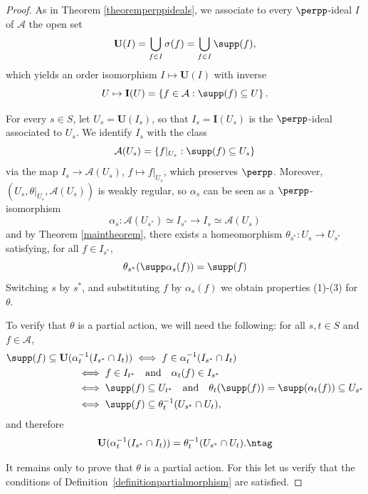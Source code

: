 \begin{proof}
As in Theorem \ref{theoremperppideals}, we associate to every $\perpp$-ideal $I$ of $\mathcal{A}$ the open set
\[\mathbf{U}(I)=\bigcup_{f\in I}\sigma(f)=\bigcup_{f\in I}\supp(f),\]
which yields an order isomorphism $I\mapsto \mathbf{U}(I)$ with inverse
\[U\mapsto\mathbf{I}(U)=\left\{f\in\mathcal{A}:\supp(f)\subseteq U\right\}.\]

For every $s\in S$, let $U_s=\mathbf{U}(I_s)$, so that $I_s=\mathbf{I}(U_s)$ is the $\perpp$-ideal associated to $U_s$. We identify $I_s$ with the class
\[\mathcal{A}(U_s)=\left\{f|_{U_s}:\supp(f)\subseteq U_s\right\}\]
via the map $I_s\to\mathcal{A}(U_s)$, $f\mapsto f|_{U_s}$, which preserves $\perpp$. Moreover, $(U_s,\theta|_{U_s},\mathcal{A}(U_s))$ is weakly regular, so $\alpha_s$ can be seen as a $\perpp$-isomorphism
\[\alpha_s:\mathcal{A}(U_{s^*})\simeq I_{s^*}\to I_s\simeq\mathcal{A}(U_s)\]
and by Theorem \ref{maintheorem}, there exists a homeomorphism $\theta_{s^*}:U_s\to U_{s^*}$ satisfying, for all $f\in I_{s^*}$,
\[\theta_{s^*}(\supp\alpha_s(f))=\supp(f)\]
Switching $s$ by $s^*$, and substituting $f$ by $\alpha_s(f)$ we obtain properties (1)-(3) for $\theta$.

To verify that $\theta$ is a partial action, we will need the following: for all $s,t\in S$ and $f\in\mathcal{A}$,
\begin{align*}
\supp(f)\subseteq\mathbf{U}(\alpha_t^{-1}(I_{s^*}\cap I_t))\hspace{-2cm}&\hspace{2cm}\iff f\in\alpha_t^{-1}(I_{s^*}\cap I_t)\\
&\iff f\in I_{t^*}\quad\text{and}\quad\alpha_t(f)\in I_{s^*}\\
&\iff\supp(f)\subseteq U_{t^*}\quad\text{and}\quad \theta_t(\supp(f))=\supp(\alpha_t(f))\subseteq U_{s^*}\\
&\iff\supp(f)\subseteq \theta_t^{-1}(U_{s^*}\cap U_t ),
\end{align*}
and therefore
\[\mathbf{U}(\alpha_t^{-1}(I_{s^*}\cap I_t))=\theta_t^{-1}(U_{s^*}\cap U_t).\ntag\label{equationpartialactiononspacecperpp}\]

 It remains only to prove that $\theta$ is a partial action. For this let us verify that the conditions of Definition~\ref{definitionpartialmorphism} are satisfied.


\end{proof}
